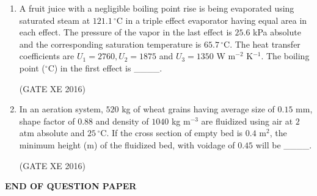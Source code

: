 \documentclass[12pt]{article}
\begin{document}
\begin{enumerate}
(GATE XE 2016)

\item A fruit juice with a negligible boiling point rise is being evaporated using saturated steam at $121.1\,^{\circ}\mathrm{C}$ in a triple effect evaporator having equal area in each effect. The pressure of the vapor in the last effect is $25.6$ kPa absolute and the corresponding saturation temperature is $65.7\,^{\circ}\mathrm{C}$. The heat transfer coefficients are $U_1 = 2760, U_2 = 1875$ and $U_3 = 1350$ W m$^{-2}$ K$^{-1}$. The boiling point ($^{\circ}$C) in the first effect is \_\_\_\_.

(GATE XE 2016)

\item In an aeration system, $520$ kg of wheat grains having average size of $0.15$ mm, shape factor of $0.88$ and density of $1040$ kg m$^{-3}$ are fluidized using air at $2$ atm absolute and $25\,^{\circ}\mathrm{C}$. If the cross section of empty bed is $0.4$ m$^{2}$, the minimum height (m) of the fluidized bed, with voidage of $0.45$ will be \_\_\_\_. 

(GATE XE 2016)


\end{enumerate}

\begin{center}
    \textbf{END OF QUESTION PAPER}
\end{center}
\end{document}

